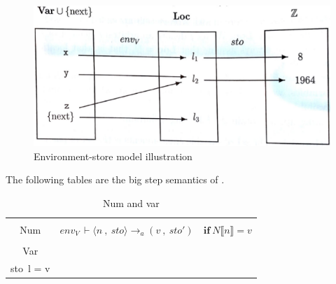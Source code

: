 \begin{figure}[H]
    \centering
    \includegraphics{resources/Images/stoloc.png}
    \caption{Environment-store model illustration \cite{stoloc}}
    \label{fig:Env}
\end{figure}

The following tables are the big step semantics of \lang{}.

\begin{table}[H]
\begin{adjustbox}{center}
\begin{tabular}{|c|c|}
\hline
\vspace {0.1pt} & \\
Num             &   \hbox{\Large \(env_V\, \vdash \langle n\: ,\ sto \rangle \rightarrow_a (v\: ,\ sto') \)\normalsize\(\quad \textbf{if}\ N\llbracket n \rrbracket = v  \)}  \vspace{0.1pt} \\ \hline 
\vspace {0.1pt} & \\  
Var             & \hbox{\Large \(env_V\, \vdash \langle x\: ,\ sto \rangle \rightarrow_a (v\: ,\ sto')\)\normalsize\( \quad \textbf{if} \: \begin{aligned}  env_V\ x=l \\ sto\ l = v \end{aligned} \)} \vspace {0.1pt} \\ \hline
\end{tabular}
\end{adjustbox}
    \caption{Num and var}
    \label{fig:declExp}
\end{table}

